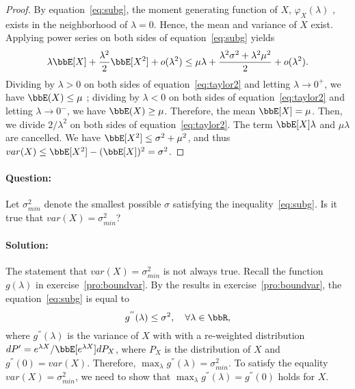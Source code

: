 \documentclass[11pt]{article}
\theoremstyle{plain}
\theoremstyle{definition}
\begin{document}
\begin{proof} By equation~\eqref{eq:subg}, the moment generating function of $X$, $\varphi_X(\lambda)$ , exists in the neighborhood of $\lambda = 0$.  Hence, the mean and variance of $X$ exist. Applying power series on both sides of equation~\eqref{eq:subg} yields 
\begin{equation}\label{eq:taylor2}
	 \lambda \bbE[X] + \frac{\lambda^2}{2} \bbE[X^2] + o(\lambda^2) \leq  \mu \lambda + \frac{\lambda^2 \sigma^2 + \lambda^2 \mu^2}{2} + o(\lambda^2).
\end{equation}
Dividing by $\lambda >0$ on both sides of equation~\eqref{eq:taylor2} and letting $\lambda \rightarrow 0^{+}$, we have $\bbE(X) \leq \mu$ ; dividing by $\lambda <0$ on both sides of equation~\eqref{eq:taylor2} and letting $\lambda \rightarrow 0^{-}$, we have $\bbE(X) \geq \mu$. Therefore, the mean $\bbE[X] = \mu$. Then, we divide ${2}/{\lambda^2}$ on both sides of equation~\eqref{eq:taylor2}. The term $\bbE[X]\lambda$ and  $\mu \lambda$ are cancelled. We have $ \bbE[X^2] \leq \sigma^2 + \mu^2$, and thus $var(X) \leq \bbE[X^2]  - (\bbE[X])^2 = \sigma^2$.
\end{proof}

\paragraph{Question:} Let $\sigma^2_{min}$ denote the smallest possible $\sigma$ satisfying the inequality~\eqref{eq:subg}. Is it true that $var(X) = \sigma_{min}^2$?

\paragraph{Solution:} The statement that $var(X) = \sigma_{min}^2$ is not always true. Recall the function $g(\lambda)$ in exercise~\ref{pro:boundvar}. By the results in exercise~\ref{pro:boundvar},  the equation~\eqref{eq:subg} is equal to 
\begin{equation}\label{eq:question}
	g^{''}(\lambda) \leq  \sigma^2, \quad \forall \lambda \in \bbR,
\end{equation}
where $g^{''} (\lambda)$ is the variance of $X$ with with a re-weighted distribution $d P' = {e^{\lambda X}}/{\bbE[ e^{\lambda X} ]} d P_X $, where $P_X$ is the distribution of $X$ and $g^{''} (0) = var(X)$. Therefore, $\max_{\lambda}g^{''}(\lambda) = \sigma_{min}^2$. To satisfy the equality $var(X) = \sigma_{min}^2$, we need to show that $\max_{\lambda}g^{''}(\lambda) = g^{''}(0)$ holds for $X$. 
\end{document}
